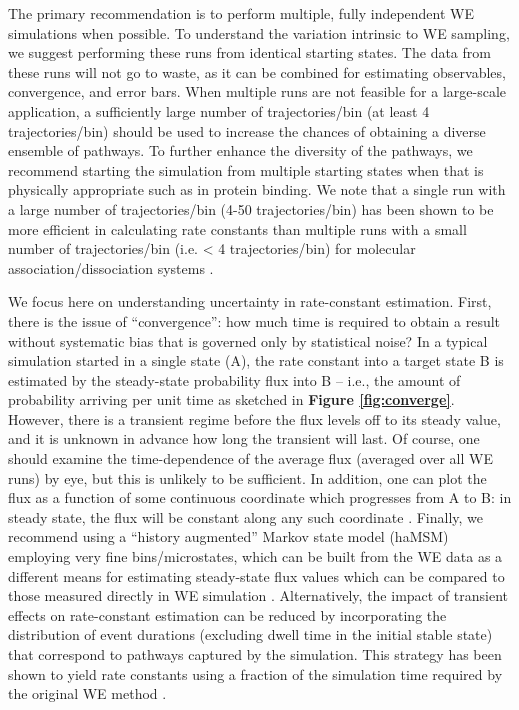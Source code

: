The primary recommendation is to perform multiple, fully independent WE simulations when possible.
To understand the variation intrinsic to WE sampling, we suggest performing these runs from identical starting states. 
The data from these runs will not go to waste, as it can be combined for estimating observables, convergence, and error bars. 
When multiple runs are not feasible for a large-scale application, a sufficiently large number of trajectories/bin (at least 4 trajectories/bin) should be used to increase the chances of obtaining a diverse ensemble of pathways. 
To further enhance the diversity of the pathways, we recommend starting the simulation from multiple starting states when that is physically appropriate such as in protein binding. 
We note that a single run with a large number of trajectories/bin (4-50 trajectories/bin) has been shown to be more efficient in calculating rate constants than multiple runs with a small number of trajectories/bin (i.e. < 4 trajectories/bin) for molecular association/dissociation systems \citep{Pratt2019}. 

We focus here on understanding uncertainty in rate-constant estimation. 
First, there is the issue of “convergence”: how much time is required to obtain a result without systematic bias that is governed only by statistical noise? 
In a typical simulation started in a single state (A), the rate constant into a target state B is estimated by the steady-state probability flux into B -- i.e., the amount of probability arriving per unit time as sketched in \textbf{Figure \ref{fig:converge}}. 
However, there is a transient regime before the flux levels off to its steady value, and it is unknown in advance how long the transient will last. 
Of course, one should examine the time-dependence of the average flux (averaged over all WE runs) by eye, but this is unlikely to be sufficient. 
In addition, one can plot the flux as a function of some continuous coordinate which progresses from A to B: in steady state, the flux will be constant along any such coordinate \citep{Jeremy2019}.
Finally, we recommend using a “history augmented” Markov state model (haMSM) employing very fine bins/microstates, which can be built from the WE data as a different means for estimating steady-state flux values which can be compared to those measured directly in WE simulation \citep{Jeremy2019}. 
Alternatively, the impact of transient effects on rate-constant estimation can be reduced by incorporating the distribution of event durations (excluding dwell time in the initial stable state) that correspond to pathways captured by the simulation. 
This strategy has been shown to yield rate constants using a fraction of the simulation time required by the original WE method \citep{DeGrave2019}. 

